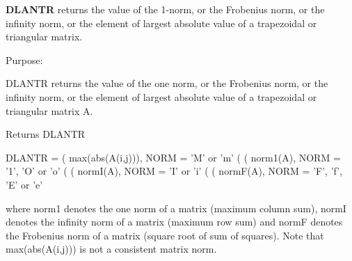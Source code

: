 {\bfseries D\+L\+A\+N\+T\+R} returns the value of the 1-\/norm, or the Frobenius norm, or the infinity norm, or the element of largest absolute value of a trapezoidal or triangular matrix. 

 \begin{DoxyParagraph}{Purpose\+: }
\begin{DoxyVerb} DLANTR  returns the value of the one norm,  or the Frobenius norm, or
 the  infinity norm,  or the  element of  largest absolute value  of a
 trapezoidal or triangular matrix A.\end{DoxyVerb}

\end{DoxyParagraph}
\begin{DoxyReturn}{Returns}
D\+L\+A\+N\+T\+R \begin{DoxyVerb}    DLANTR = ( max(abs(A(i,j))), NORM = 'M' or 'm'
             (
             ( norm1(A),         NORM = '1', 'O' or 'o'
             (
             ( normI(A),         NORM = 'I' or 'i'
             (
             ( normF(A),         NORM = 'F', 'f', 'E' or 'e'

 where  norm1  denotes the  one norm of a matrix (maximum column sum),
 normI  denotes the  infinity norm  of a matrix  (maximum row sum) and
 normF  denotes the  Frobenius norm of a matrix (square root of sum of
 squares).  Note that  max(abs(A(i,j)))  is not a consistent matrix norm.\end{DoxyVerb}
 
\end{DoxyReturn}

